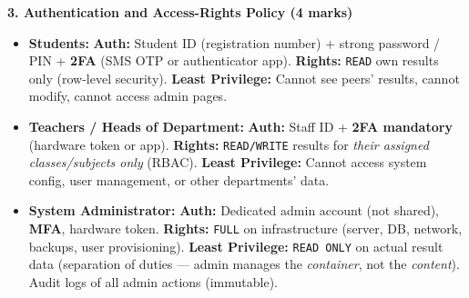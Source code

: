 \documentclass[11pt]{article}
\begin{document}
\begin{corrige}
\textbf{3. Authentication and Access-Rights Policy (4 marks)}
\begin{itemize}
\item \textbf{Students:} \textbf{Auth:} Student ID (registration number) + strong password / PIN + \textbf{2FA} (SMS OTP or authenticator app). \textbf{Rights:} \texttt{READ} own results only (row-level security). \textbf{Least Privilege:} Cannot see peers' results, cannot modify, cannot access admin pages.
\item \textbf{Teachers / Heads of Department:} \textbf{Auth:} Staff ID + \textbf{2FA mandatory} (hardware token or app). \textbf{Rights:} \texttt{READ/WRITE} results for \emph{their assigned classes/subjects only} (RBAC). \textbf{Least Privilege:} Cannot access system config, user management, or other departments' data.
\item \textbf{System Administrator:} \textbf{Auth:} Dedicated admin account (not shared), \textbf{MFA}, hardware token. \textbf{Rights:} \texttt{FULL} on infrastructure (server, DB, network, backups, user provisioning). \textbf{Least Privilege:} \texttt{READ ONLY} on actual result data (separation of duties — admin manages the \emph{container}, not the \emph{content}). Audit logs of all admin actions (immutable).
\end{itemize}


\end{corrige}
\end{document}
